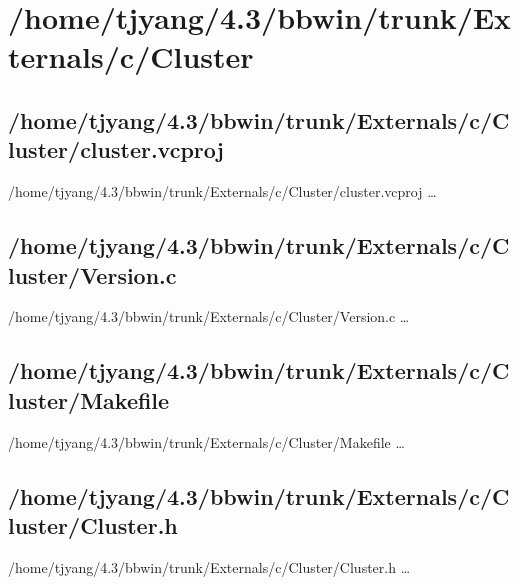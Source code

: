 \section{/home/tjyang/4.3/bbwin/trunk/Externals/c/Cluster}

\subsection{/home/tjyang/4.3/bbwin/trunk/Externals/c/Cluster/cluster.vcproj}
\lstset{numberstyle=\tiny,numbers=left,
   breaklines=true,
   stepnumber=1,numbersep=5pt,firstnumber=1,
   xleftmargin=12pt,showstringspaces=false}
\noindent /home/tjyang/4.3/bbwin/trunk/Externals/c/Cluster/cluster.vcproj  \ldots



\subsection{/home/tjyang/4.3/bbwin/trunk/Externals/c/Cluster/Version.c}
\lstset{numberstyle=\tiny,numbers=left,
   breaklines=true,
   stepnumber=1,numbersep=5pt,firstnumber=1,
   xleftmargin=12pt,showstringspaces=false}
\noindent /home/tjyang/4.3/bbwin/trunk/Externals/c/Cluster/Version.c  \ldots



\subsection{/home/tjyang/4.3/bbwin/trunk/Externals/c/Cluster/Makefile}
\lstset{numberstyle=\tiny,numbers=left,
   breaklines=true,
   stepnumber=1,numbersep=5pt,firstnumber=1,
   xleftmargin=12pt,showstringspaces=false}
\noindent /home/tjyang/4.3/bbwin/trunk/Externals/c/Cluster/Makefile  \ldots




\subsection{/home/tjyang/4.3/bbwin/trunk/Externals/c/Cluster/Cluster.h}
\lstset{numberstyle=\tiny,numbers=left,
   breaklines=true,
   stepnumber=1,numbersep=5pt,firstnumber=1,
   xleftmargin=12pt,showstringspaces=false}
\noindent /home/tjyang/4.3/bbwin/trunk/Externals/c/Cluster/Cluster.h  \ldots



